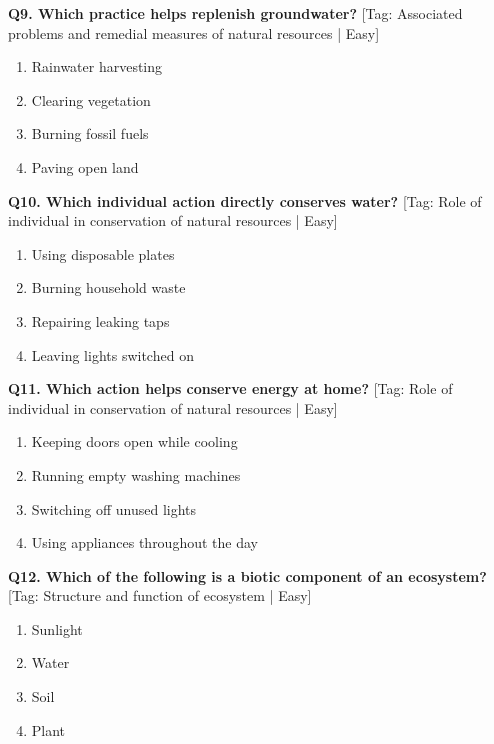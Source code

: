 \noindent\textbf{Q9. Which practice helps replenish groundwater?} \hfill [Tag: Associated problems and remedial measures of natural resources | Easy]
\begin{enumerate}[label=(\alph*),topsep=2pt,itemsep=1pt,partopsep=0pt,parsep=0pt]
    \item {Rainwater harvesting}
    \item {Clearing vegetation}
    \item {Burning fossil fuels}
    \item {Paving open land}
\end{enumerate}
\vspace{2mm}

\noindent\textbf{Q10. Which individual action directly conserves water?} \hfill [Tag: Role of individual in conservation of natural resources | Easy]
\begin{enumerate}[label=(\alph*),topsep=2pt,itemsep=1pt,partopsep=0pt,parsep=0pt]
    \item {Using disposable plates}
    \item {Burning household waste}
    \item {Repairing leaking taps}
    \item {Leaving lights switched on}
\end{enumerate}
\vspace{2mm}

\noindent\textbf{Q11. Which action helps conserve energy at home?} \hfill [Tag: Role of individual in conservation of natural resources | Easy]
\begin{enumerate}[label=(\alph*),topsep=2pt,itemsep=1pt,partopsep=0pt,parsep=0pt]
    \item {Keeping doors open while cooling}
    \item {Running empty washing machines}
    \item {Switching off unused lights}
    \item {Using appliances throughout the day}
\end{enumerate}
\vspace{2mm}

\noindent\textbf{Q12. Which of the following is a biotic component of an ecosystem?} \hfill [Tag: Structure and function of ecosystem | Easy]
\begin{enumerate}[label=(\alph*),topsep=2pt,itemsep=1pt,partopsep=0pt,parsep=0pt]
    \item {Sunlight}
    \item {Water}
    \item {Soil}
    \item {Plant}
\end{enumerate}
\vspace{2mm}

